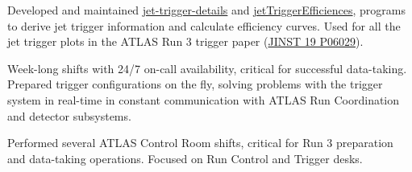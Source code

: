 
\begin{cventries}

    {Developed and maintained \href{https://gitlab.cern.ch/atlas-trigger/jet/jet-trigger-details}{jet-trigger-details} and \href{https://gitlab.cern.ch/atlas-trigger/jet/jetTriggerEfficiencies/-/tree/R22-master}{jetTriggerEfficiences}, programs to derive jet trigger information and calculate efficiency curves. Used for all the jet trigger plots in the ATLAS Run 3 trigger paper (\href{https://doi.org/10.1088/1748-0221/19/06/P06029}{JINST 19 P06029}).}

    {Week-long shifts with 24/7 on-call availability, critical for successful data-taking. Prepared trigger configurations on the fly, solving problems with the trigger system in real-time in constant communication with ATLAS Run Coordination and detector subsystems.}

    {Performed several ATLAS Control Room shifts, critical for Run 3 preparation and data-taking operations. Focused on Run Control and Trigger desks.}

\end{cventries}